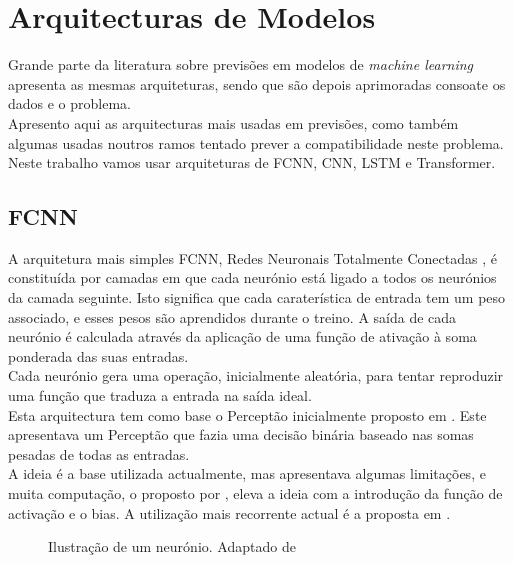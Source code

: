 \section{Arquitecturas de Modelos\label{se:arquiteturas_modelos}}

Grande parte da literatura sobre previsões em modelos de \textit{machine learning} apresenta as mesmas arquiteturas, sendo que são depois aprimoradas consoate os dados e o problema. \\
Apresento aqui as arquitecturas mais usadas em previsões, como também algumas usadas noutros ramos tentado prever a compatibilidade neste problema. \\
Neste trabalho vamos usar arquiteturas de \gls{FCNN}, \gls{CNN}, \gls{LSTM} e Transformer.\\




\subsection{FCNN\label{se:fcnn_sec}}

A arquitetura mais simples \gls{FCNN}, Redes Neuronais Totalmente Conectadas , é constituída por camadas em que cada neurónio está ligado a todos os neurónios da camada seguinte. Isto significa que cada caraterística de entrada tem um peso associado, e esses pesos são aprendidos durante o treino. A saída de cada neurónio é calculada através da aplicação de uma função de ativação à soma ponderada das suas entradas.\\
Cada neurónio gera uma operação, inicialmente aleatória, para tentar reproduzir uma função que traduza a entrada na saída ideal.\\
Esta arquitectura tem como base o Perceptão inicialmente proposto em \cite{Rosenblatt1958}. Este apresentava um Perceptão que fazia uma decisão binária baseado nas somas pesadas de todas as entradas.\\
A ideia é a base utilizada actualmente, mas apresentava algumas limitações, e muita computação, o proposto por \cite{Minsky1969}, eleva a ideia com a introdução da função de activação e o bias. A utilização mais recorrente actual é a proposta em \cite{Haykin1999}.


\begin{figure}[H]
	\centering
	\resizebox{\linewidth}{!}{}
	\caption{Ilustração de um neurónio. Adaptado de \cite{Haykin1999}}
	\label{fig:neuronio}
\end{figure}



